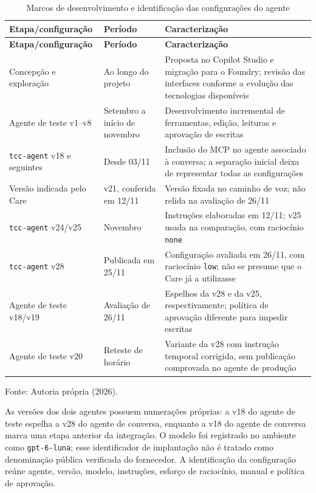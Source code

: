 {\small\setlength{\tabcolsep}{3pt}\begin{longtable}{p{}p{}p{}}
\caption{Marcos de desenvolvimento e identificação das configurações do agente}\label{tab:13-versoes}\\
\hline\textbf{Etapa/configuração} & \textbf{Período} & \textbf{Caracterização}\\\hline\endfirsthead
\hline\textbf{Etapa/configuração} & \textbf{Período} & \textbf{Caracterização}\\\hline\endhead
Concepção e exploração & Ao longo do projeto & Proposta no Copilot Studio e migração para o Foundry; revisão das interfaces conforme a evolução das tecnologias disponíveis\\\hline
Agente de teste v1--v8 & Setembro a início de novembro & Desenvolvimento incremental de ferramentas, edição, leituras e aprovação de escritas\\\hline
\texttt{tcc-agent} v18 e seguintes & Desde 03/11 & Inclusão do MCP no agente associado à conversa; a separação inicial deixa de representar todas as configurações\\\hline
Versão indicada pelo Care & v21, conferida em 12/11 & Versão fixada no caminho de voz; não relida na avaliação de 26/11\\\hline
\texttt{tcc-agent} v24/v25 & Novembro & Instruções elaboradas em 12/11; v25 usada na comparação, com raciocínio \texttt{none}\\\hline
\texttt{tcc-agent} v28 & Publicada em 25/11 & Configuração avaliada em 26/11, com raciocínio \texttt{low}; não se presume que o Care já a utilizasse\\\hline
Agente de teste v18/v19 & Avaliação de 26/11 & Espelhos da v28 e da v25, respectivamente; política de aprovação diferente para impedir escritas\\\hline
Agente de teste v20 & Reteste de horário & Variante da v28 com instrução temporal corrigida, sem publicação comprovada no agente de produção\\\hline
\end{longtable}\noindent Fonte: Autoria própria (2026).\par}

As versões dos dois agentes possuem numerações próprias: a v18 do agente de teste espelha a v28 do agente de conversa, enquanto a v18 do agente de conversa marca uma etapa anterior da integração. O modelo foi registrado no ambiente como \texttt{gpt-6-luna}; esse identificador de implantação não é tratado como denominação pública verificada do fornecedor. A identificação da configuração reúne agente, versão, modelo, instruções, esforço de raciocínio, manual e política de aprovação.

